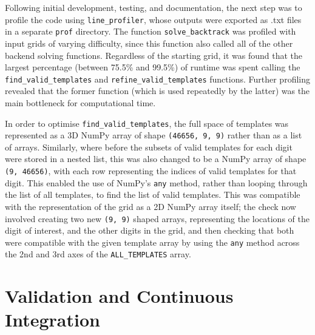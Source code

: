 \documentclass[12pt]{article}
\begin{document}
Following initial development, testing, and documentation, the next step was to profile the code using \texttt{line\_profiler}, whose outputs were exported as .txt files in a separate \texttt{prof} directory.
The function \texttt{solve\_backtrack} was profiled with input grids of varying difficulty, since this function also called all of the other backend solving functions.
Regardless of the starting grid, it was found that the largest percentage (between 75.5\% and 99.5\%) of runtime was spent calling the \texttt{find\_valid\_templates} and \texttt{refine\_valid\_templates} functions.
Further profiling revealed that the former function (which is used repeatedly by the latter) was the main bottleneck for computational time.

In order to optimise \texttt{find\_valid\_templates}, the full space of templates was represented as a 3D NumPy array of shape \texttt{(46656, 9, 9)} rather than as a list of arrays.
Similarly, where before the subsets of valid templates for each digit were stored in a nested list, this was also changed to be a NumPy array of shape \texttt{(9, 46656)}, with each row representing the indices of valid templates for that digit.
This enabled the use of NumPy's \texttt{any} method, rather than looping through the list of all templates, to find the list of valid templates.
This was compatible with the representation of the grid as a 2D NumPy array itself; the check now involved creating two new \texttt{(9, 9)} shaped arrays, representing the locations of the digit of interest, and the other digits in the grid, and then checking that both were compatible with the given template array by using the \texttt{any} method across the 2nd and 3rd axes of the \texttt{ALL\_TEMPLATES} array.

\section{Validation and Continuous Integration}
\end{document}
